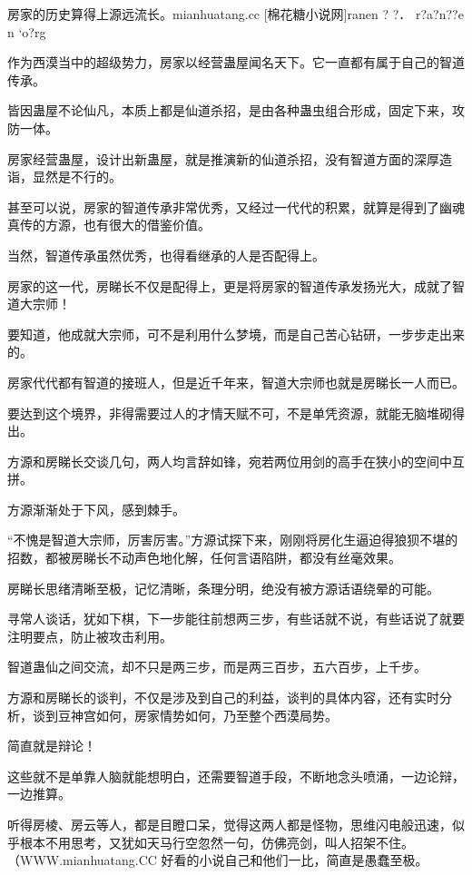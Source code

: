 
\begin{this_body}

房家的历史算得上源远流长。mianhuatang.cc [棉花糖小说网]ranen ? ?． r?a?n??e n `o?rg

作为西漠当中的超级势力，房家以经营蛊屋闻名天下。它一直都有属于自己的智道传承。

皆因蛊屋不论仙凡，本质上都是仙道杀招，是由各种蛊虫组合形成，固定下来，攻防一体。

房家经营蛊屋，设计出新蛊屋，就是推演新的仙道杀招，没有智道方面的深厚造诣，显然是不行的。

甚至可以说，房家的智道传承非常优秀，又经过一代代的积累，就算是得到了幽魂真传的方源，也有很大的借鉴价值。

当然，智道传承虽然优秀，也得看继承的人是否配得上。

房家的这一代，房睇长不仅是配得上，更是将房家的智道传承发扬光大，成就了智道大宗师！

要知道，他成就大宗师，可不是利用什么梦境，而是自己苦心钻研，一步步走出来的。

房家代代都有智道的接班人，但是近千年来，智道大宗师也就是房睇长一人而已。

要达到这个境界，非得需要过人的才情天赋不可，不是单凭资源，就能无脑堆砌得出。

方源和房睇长交谈几句，两人均言辞如锋，宛若两位用剑的高手在狭小的空间中互拼。

方源渐渐处于下风，感到棘手。

“不愧是智道大宗师，厉害厉害。”方源试探下来，刚刚将房化生逼迫得狼狈不堪的招数，都被房睇长不动声色地化解，任何言语陷阱，都没有丝毫效果。

房睇长思绪清晰至极，记忆清晰，条理分明，绝没有被方源话语绕晕的可能。

寻常人谈话，犹如下棋，下一步能往前想两三步，有些话就不说，有些话说了就要注明要点，防止被攻击利用。

智道蛊仙之间交流，却不只是两三步，而是两三百步，五六百步，上千步。

方源和房睇长的谈判，不仅是涉及到自己的利益，谈判的具体内容，还有实时分析，谈到豆神宫如何，房家情势如何，乃至整个西漠局势。

简直就是辩论！

这些就不是单靠人脑就能想明白，还需要智道手段，不断地念头喷涌，一边论辩，一边推算。

听得房棱、房云等人，都是目瞪口呆，觉得这两人都是怪物，思维闪电般迅速，似乎根本不用思考，又犹如天马行空忽然一句，仿佛亮剑，叫人招架不住。（WWW.mianhuatang.CC 好看的小说自己和他们一比，简直是愚蠢至极。


\end{this_body}
